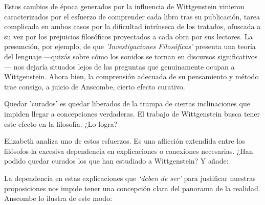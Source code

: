 Estos cambios de época generados por la influencia de Wittgenstein vinieron
caracterizados por el esfuerzo de comprender cada libro tras su publicación,
tarea complicada en ambos casos por la dificultad intrínseca de los tratados,
ofuscada a su vez por los prejuicios filosóficos proyectados a cada obra por sus
lectores. La presunción, por ejemplo, de que \emph{'Investigaciones
  Filosóficas'} presenta una teoría del lenguaje ---quizás sobre cómo los
sonidos se tornan en discursos significativos--- nos dejaría situados lejos de
las preguntas que genuinamente ocupan a
Wittgenstein.\autocite[cf.~][p.~183]{twocuts} Ahora bien, la comprensión
adecuada de su pensamiento y método trae consigo, a juicio de Anscombe, cierto
efecto curativo.

Quedar 'curados' es quedar liberados de la trampa de ciertas inclinaciones que
impiden llegar a concepciones verdaderas. El trabajo de Wittgenstein busca tener
este efecto en la filosofía. ¿Lo logra?

Elizabeth analiza uno de estos esfuerzos. Es una aflicción extendida entre los
filósofos la excesiva dependencia en explicaciones o conexiones necesarias. ¿Han
podido quedar curados los que han estudiado a Wittgenstein? Y añade:

La dependencia en estas explicaciones que \emph{`deben de ser'} para justificar
nuestras proposiciones nos impide tener una concepción clara del panorama de la
realidad. Anscombe lo ilustra de este modo:

